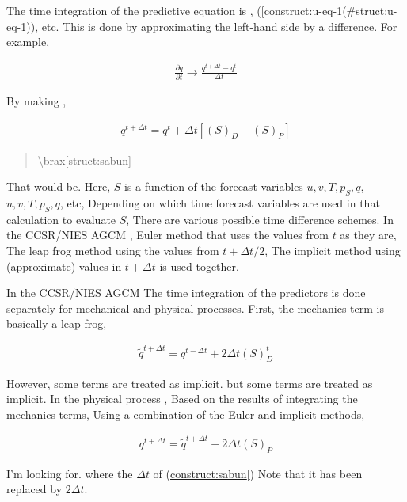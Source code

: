 The time integration of the predictive equation is ,
({[}construct:u-eq-1\en[construct:u-eq-1\end{eqnarray}](\#struct:u-eq-1)), etc. This
is done by approximating the left-hand side by a difference. For
example,

\begin{eqnarray}
  \frac{\partial q}{\partial t} \rightarrow \frac{q^{t+\Delta t} - q^{t}}{\Delta t}
\end{eqnarray}

By making ,

\begin{eqnarray}
  q^{t+\Delta t} = q^{t} 
       + \Delta t \left[ \left( S \right)_D + \left( S \right)_P  \right]
\end{eqnarray}

\begin{quote}
\protect\hypertarget{struct:sabun}{}{\textbackslash brax{[}struct:sabun{]}}
\end{quote}

That would be. Here, \(S\) is a function of the forecast variables
\(u,v,T,p_S,q\), \(u,v,T,p_S,q\), etc, Depending on which time forecast
variables are used in that calculation to evaluate \(S\), There are
various possible time difference schemes. In the CCSR/NIES AGCM , Euler
method that uses the values from \(t\) as they are, The leap frog method
using the values from \(t+\Delta t/2\), The implicit method using
(approximate) values in \(t+\Delta t\) is used together.

In the CCSR/NIES AGCM The time integration of the predictors is done
separately for mechanical and physical processes. First, the mechanics
term is basically a leap frog,

\begin{eqnarray}
  \tilde{q}^{t+\Delta t} = q^{t-\Delta t} + 2 \Delta t \left( S \right)_D^{t}
\end{eqnarray}

However, some terms are treated as implicit. but some terms are treated
as implicit. In the physical process , Based on the results of
integrating the mechanics terms, Using a combination of the Euler and
implicit methods,

\begin{eqnarray}
  q^{t+\Delta t} = \tilde{q}^{t+\Delta t} + 2 \Delta t \left( S \right)_P
\end{eqnarray}

I'm looking for. where the \(\Delta t\) of
(\protect\hyperlink{struct:sabun}{construct:sabun{]}}) Note that it has
been replaced by \(2 \Delta t\).


